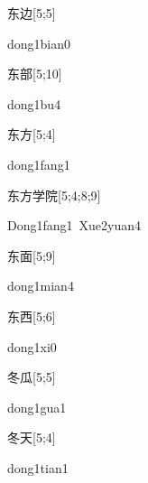 \begin{verbete}{东边}[5;5]
\begin{pronuncia}{dong1bian0}
\end{pronuncia}
\end{verbete}

\begin{verbete}[dong1bu4]{东部}[5;10]
\begin{pronuncia}{dong1bu4}
\end{pronuncia}
\end{verbete}

\begin{verbete}{东方}[5;4]
\begin{pronuncia}{dong1fang1}
\end{pronuncia}
\end{verbete}

\begin{verbete}{东方学院}[5;4;8;9]
\begin{pronuncia}[\\]{Dong1fang1\ Xue2yuan4}
\end{pronuncia}
\end{verbete}

\begin{verbete}{东面}[5;9]
\begin{pronuncia}{dong1mian4}
\end{pronuncia}
\end{verbete}

\begin{verbete}[dong1xi0]{东西}[5;6]
\begin{pronuncia}{dong1xi0}
\end{pronuncia}
\end{verbete}

\begin{verbete}{冬瓜}[5;5]
\begin{pronuncia}{dong1gua1}
\end{pronuncia}
\end{verbete}

\begin{verbete}{冬天}[5;4]
\begin{pronuncia}{dong1tian1}
\end{pronuncia}
\end{verbete}

